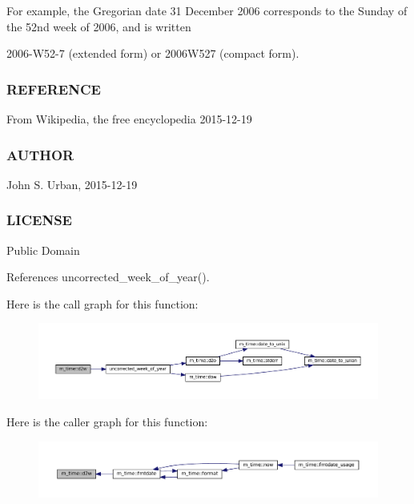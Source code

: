 For example, the Gregorian date 31 December 2006 corresponds to the Sunday of the 52nd week of 2006, and is written

2006-\/\+W52-\/7 (extended form) or 2006\+W527 (compact form).

\subsubsection*{R\+E\+F\+E\+R\+E\+N\+CE}

From Wikipedia, the free encyclopedia 2015-\/12-\/19

\subsubsection*{A\+U\+T\+H\+OR}

John S. Urban, 2015-\/12-\/19 \subsubsection*{L\+I\+C\+E\+N\+SE}

Public Domain 

References uncorrected\+\_\+week\+\_\+of\+\_\+year().

Here is the call graph for this function\+:\nopagebreak
\begin{figure}[H]
\begin{center}
\leavevmode
\includegraphics[width=350pt]{namespacem__time_ad4ff99ad6f6d5282c4b65ad636a2a627_cgraph}
\end{center}
\end{figure}
Here is the caller graph for this function\+:\nopagebreak
\begin{figure}[H]
\begin{center}
\leavevmode
\includegraphics[width=350pt]{namespacem__time_ad4ff99ad6f6d5282c4b65ad636a2a627_icgraph}
\end{center}
\end{figure}
\mbox{\label{namespacem__time_acfdc970b4154b0c15bd33727636e3992}} 
